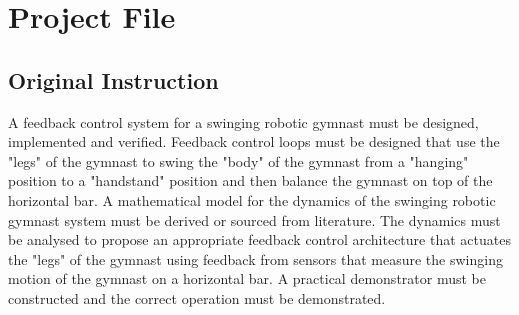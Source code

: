 \chapter{Project File}
\label{chp:intro}

\section{Original Instruction}
A feedback control system for a swinging robotic gymnast must be designed, implemented and verified. Feedback control loops must be designed that use the "legs" of the gymnast to swing the "body" of the gymnast from a "hanging" position to a "handstand" position and then balance the gymnast on top of the horizontal bar. A mathematical model for the dynamics of the swinging robotic gymnast system must be derived or sourced from literature. The dynamics must be analysed to propose an appropriate feedback control architecture that actuates the "legs" of the gymnast using feedback from sensors that measure the swinging motion of the gymnast on a horizontal bar. A practical demonstrator must be constructed and the correct operation must be demonstrated.














